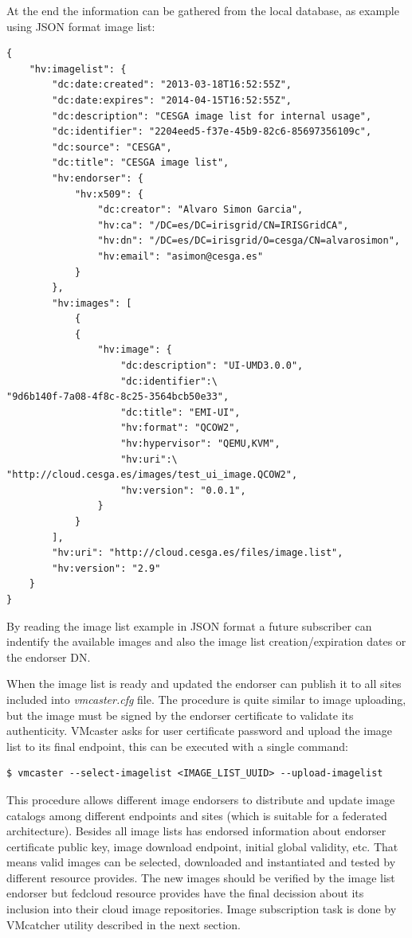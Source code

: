 \documentclass[oribibl]{llncs_Ibergrid2013}
\begin{document}
At the end the information can be gathered from the local database, as example using JSON format image list:
\begin{verbatim}
{
    "hv:imagelist": {
        "dc:date:created": "2013-03-18T16:52:55Z", 
        "dc:date:expires": "2014-04-15T16:52:55Z", 
        "dc:description": "CESGA image list for internal usage", 
        "dc:identifier": "2204eed5-f37e-45b9-82c6-85697356109c", 
        "dc:source": "CESGA", 
        "dc:title": "CESGA image list", 
        "hv:endorser": {
            "hv:x509": {
                "dc:creator": "Alvaro Simon Garcia", 
                "hv:ca": "/DC=es/DC=irisgrid/CN=IRISGridCA", 
                "hv:dn": "/DC=es/DC=irisgrid/O=cesga/CN=alvarosimon", 
                "hv:email": "asimon@cesga.es"
            }
        }, 
        "hv:images": [
            {
            {
                "hv:image": {
                    "dc:description": "UI-UMD3.0.0", 
                    "dc:identifier":\ 
"9d6b140f-7a08-4f8c-8c25-3564bcb50e33", 
                    "dc:title": "EMI-UI", 
                    "hv:format": "QCOW2", 
                    "hv:hypervisor": "QEMU,KVM",  
                    "hv:uri":\ 
"http://cloud.cesga.es/images/test_ui_image.QCOW2", 
                    "hv:version": "0.0.1", 
                }
            }
        ], 
        "hv:uri": "http://cloud.cesga.es/files/image.list", 
        "hv:version": "2.9"
    }
}
\end{verbatim}
By reading the image list example in JSON format a future subscriber can indentify the available images and also the image list creation/expiration dates or the endorser DN.

When the image list is ready and updated the endorser can publish it to all sites included into \textit{vmcaster.cfg} file. 
The procedure is quite similar to image uploading, but the image must be signed by the endorser certificate to validate its authenticity.
VMcaster asks for user certificate password and upload the image list to its final endpoint, this can be executed with a single command:
\begin{verbatim}
$ vmcaster --select-imagelist <IMAGE_LIST_UUID> --upload-imagelist
\end{verbatim}
This procedure allows different image endorsers to distribute and update image catalogs among different endpoints and sites (which is suitable for a federated architecture).
Besides all image lists has endorsed information about endorser certificate public key, image download endpoint, initial global validity, etc. 
That means valid images can be selected, downloaded and instantiated and tested by different resource provides. 
The new images should be verified by the image list endorser but fedcloud resource provides have the final decission about its inclusion into their cloud image repositories. 
Image subscription task is done by VMcatcher utility described in the next section.
\end{document}
